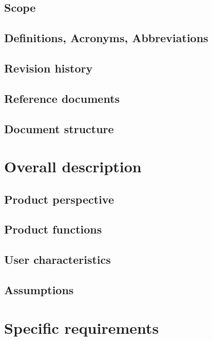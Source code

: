 \documentclass[a4paper,oneside,11pt]{article}
\begin{document}
        \subsection{Scope}
        \subsection{Definitions, Acronyms, Abbreviations}
        \subsection{Revision history}
        \subsection{Reference documents}
        \subsection{Document structure}
        
        
    \section{Overall description}
        \subsection{Product perspective}
        \subsection{Product functions}
        \subsection{User characteristics}
        \subsection{Assumptions}
        
        
    \section{Specific requirements}
\end{document}
